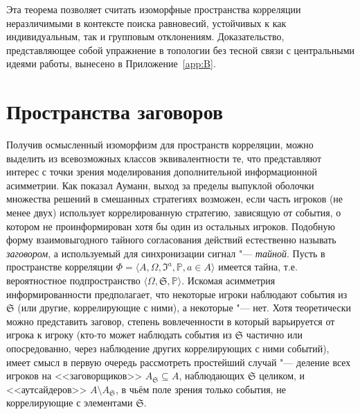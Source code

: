 Эта теорема позволяет считать изоморфные пространства корреляции неразличимыми в контексте поиска равновесий, устойчивых к как индивидуальным, так и групповым отклонениям. Доказательство, представляющее собой упражнение в топологии без тесной связи с центральными идеями работы, вынесено в Приложение~\cref{app:B}.

\section{Пространства заговоров}\label{sec:ch1/sec3}

Получив осмысленный изоморфизм для пространств корреляции, можно выделить из всевозможных классов эквивалентности те, что представляют интерес с точки зрения моделирования дополнительной информационной асимметрии. Как показал Ауманн, выход за пределы выпуклой оболочки множества решений в смешанных стратегиях возможен, если часть игроков (не менее двух) использует коррелированную стратегию, зависящую от события, о котором не проинформирован хотя бы один из остальных игроков. Подобную форму взаимовыгодного тайного согласования действий естественно называть \emph{заговором}, а используемый для синхронизации сигнал "--- \emph{тайной}. Пусть в пространстве корреляции $\Phi = \langle A, \Omega, \mathfrak{I}^a, \mathbb{P}, a \in A \rangle$ имеется тайна, т.е. вероятностное подпространство $\langle \Omega, \mathfrak{S}, \mathbb{P} \rangle$. Искомая асимметрия информированности предполагает, что некоторые игроки наблюдают события из $\mathfrak{S}$ (или другие, коррелирующие с ними), а некоторые "--- нет. Хотя теоретически можно представить заговор, степень вовлеченности в который варьируется от игрока к игроку (кто-то может наблюдать события из $\mathfrak{S}$ частично или опосредованно, через наблюдение других коррелирующих с ними событий), имеет смысл в первую очередь рассмотреть простейший случай "--- деление всех игроков на <<заговорщиков>> $A_{\mathfrak{S}} \subseteq A$, наблюдающих $\mathfrak{S}$ целиком, и <<аутсайдеров>> $A \setminus A_{\mathfrak{S}}$, в чьём поле зрения только события, не коррелирующие с элементами $\mathfrak{S}$.

